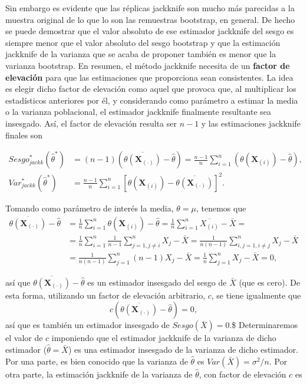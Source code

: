 \documentclass[
]{book}
\theoremstyle{break}
\theoremstyle{definition}
\theoremstyle{definition}
\theoremstyle{definition}
\theoremstyle{definition}
\theoremstyle{remark}
\begin{document}
Sin embargo es evidente que las réplicas jackknife son mucho más
parecidas a la muestra original de lo que lo son las remuestras
bootstrap, en general. De hecho se puede demostrar que el valor absoluto
de ese estimador jackknife del sesgo es siempre menor que el valor
absoluto del sesgo bootstrap y que la estimación jackknife de la
varianza que se acaba de proponer también es menor que la varianza
bootstrap. En resumen, el método jackknife necesita de un \textbf{factor de
elevación} para que las estimaciones que proporciona sean consistentes.
La idea es elegir dicho factor de elevación como aquel que provoca que,
al multiplicar los estadísticos anteriores por él, y considerando como
parámetro a estimar la media o la varianza poblacional, el estimador
jackknife finalmente resultante sea insesgado. Así, el factor de
elevación resulta ser \(n-1\) y las estimaciones jackknife finales son

\[\begin{aligned}
Sesgo_{jackk}^{\ast}\left( \hat{\theta}^{\ast} \right) &= \left( n-1 \right)
\left( \overline{\theta \left( \mathbf{X}_{(\cdot)}
 \right)}-\hat{\theta} \right) =\frac{n-1}{n}\sum_{i=1}^{n}\left( \theta
\left( \mathbf{X}_{(i)} \right) -\hat{\theta} \right), \\
Var_{jackk}^{\ast}\left( \hat{\theta}^{\ast} \right) &= \frac{n-1}{n}
\sum_{i=1}^{n}\left[ \theta \left( \mathbf{X}_{(i)}
 \right) -\overline{\theta \left( \mathbf{X}_{(\cdot)}
 \right)}\right]^2.
\end{aligned}\]

Tomando como parámetro de interés la media, \(\theta =\mu\), tenemos que
\[\begin{aligned}
\overline{\theta \left( \mathbf{X}_{(\cdot)} \right)}-
\hat{\theta} &= \frac{1}{n}\sum_{i=1}^{n}\theta \left( 
\mathbf{X}_{(i)} \right) -\hat{\theta}=\frac{1}{n}\sum_{i=1}^{n}
\overline{X_{(i)}}-\bar{X}= \\
&= \frac{1}{n}\sum_{i=1}^{n}\frac{1}{n-1}\sum_{j=1,j\neq i}^{n}X_j-
\bar{X}=\frac{1}{n\left( n-1 \right)}\sum_{i,j=1,i\neq j}^{n}X_j-
\bar{X} \\
&= \frac{1}{n\left( n-1 \right)}\sum_{j=1}^{n}\left( n-1 \right) X_j-
\bar{X}=\frac{1}{n}\sum_{j=1}^{n}X_j-\bar{X}=0,\end{aligned}\]

así que \(\overline{\theta \left( \mathbf{X}_{(\cdot)} \right)}-\hat{\theta}\) es un estimador insesgado del sesgo de
\(\bar{X}\) (que es cero). De esta forma, utilizando un factor de
elevación arbitrario, \(c\), se tiene igualmente que
\[c\left( \overline{\theta \left( \mathbf{X}_{(\cdot)} \right)}
- \hat{\theta} \right) = 0,\]
así que es también un estimador insesgado de
\(Sesgo\left( \bar{X} \right) =0.\)\$
Determinaremos el valor de \(c\)
imponiendo que el estimador jackknife de la varianza de dicho estimador
(\(\hat{\theta}=\bar{X}\)) es una estimador insesgado de la varianza de
dicho estimador. Por una parte, es bien conocido que la varianza de
\(\hat{\theta}\) es \(Var\left( \bar{X} \right) = \sigma^2 /n\).
Por otra parte, la estimación jackknife de la varianza de \(\hat{\theta}\),
con factor de elevación \(c\) es
\end{document}
